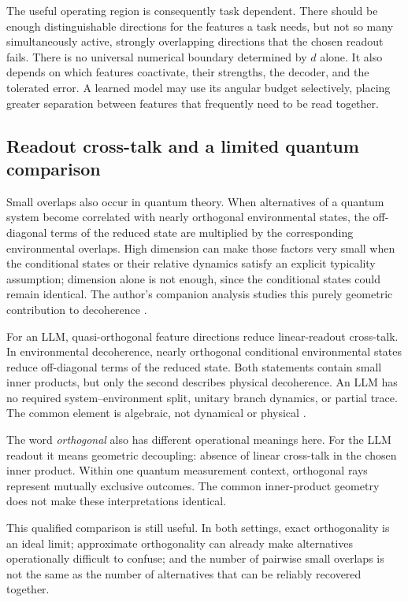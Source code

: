 \documentclass[
  aps,
  reprint,
  superscriptaddress,
  floatfix,
  nofootinbib,
  longbibliography
]{revtex4-2}
\begin{document}
The useful operating region is consequently task dependent.  There should be
enough distinguishable directions for the features a task needs, but not so
many simultaneously active, strongly overlapping directions that the chosen
readout fails.  There is no universal numerical boundary determined by $d$
alone.  It also depends on which features coactivate, their strengths, the
decoder, and the tolerated error.  A learned model may use its angular budget
selectively, placing greater separation between features that frequently need
to be read together.

\subsection{Readout cross-talk and a limited quantum comparison}

Small overlaps also occur in quantum theory.  When alternatives of a quantum
system become correlated with nearly orthogonal environmental states, the
off-diagonal terms of the reduced state are multiplied by the corresponding
environmental overlaps.  High dimension can make those factors very small
when the conditional states or their relative dynamics satisfy an explicit
typicality assumption; dimension alone is not enough, since the conditional
states could remain identical.  The author's companion analysis studies this
purely geometric contribution to decoherence
\cite{svozil2026geometricdecoherence}.

For an LLM, quasi-orthogonal feature directions reduce linear-readout
cross-talk.  In environmental decoherence, nearly orthogonal conditional
environmental states reduce off-diagonal terms of the reduced state.  Both
statements contain small inner products, but only the second describes
physical decoherence.  An LLM has no required system--environment split,
unitary branch dynamics, or partial trace.  The common element is algebraic,
not dynamical or physical \cite{RevModPhys.75.715}.

The word \emph{orthogonal} also has different operational meanings here.  For
the LLM readout it means geometric decoupling: absence of linear cross-talk in
the chosen inner product.  Within one quantum measurement
context, orthogonal rays represent
mutually exclusive outcomes.  The common inner-product geometry does not make
these interpretations identical.

This qualified comparison is still useful.  In both settings, exact
orthogonality is an ideal limit; approximate orthogonality can already make
alternatives operationally difficult to confuse; and the number of pairwise
small overlaps is not the same as the number of alternatives that can be
reliably recovered together.
\end{document}
